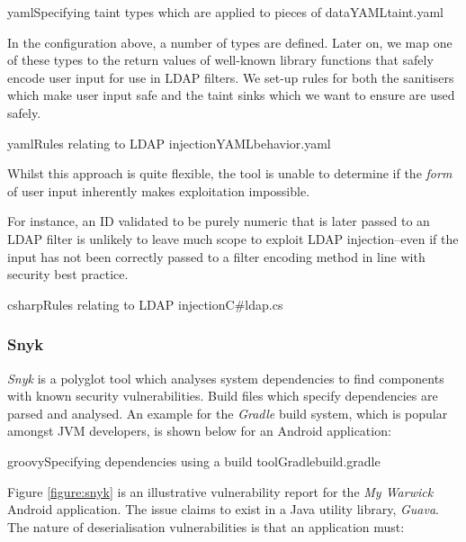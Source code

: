 \documentclass[a4paper,openany,12pt]{book}
\begin{document}
\begin{mycodefile}{yaml}{\label{code:scs:1}Specifying taint types which are applied to pieces of data}{YAML}{taint.yaml}
\end{mycodefile}

In the configuration above, a number of types are defined. Later on, we map one of these types to the return values of
well-known library functions that safely encode user input for use in LDAP filters.
We set-up rules for both the sanitisers which make user input safe and the taint sinks which we want to ensure are used
safely.

\begin{mycodefile}{yaml}{\label{code:scs:2}Rules relating to LDAP injection}{YAML}{behavior.yaml}
\end{mycodefile}

Whilst this approach is quite flexible, the tool is unable to determine if the \textit{form} of user input inherently
makes exploitation impossible.

For instance, an ID validated to be purely numeric that is later passed to an LDAP filter is unlikely to leave much
scope to exploit LDAP injection--even if the input has not been correctly passed to a filter encoding method in
line with security best practice.

\begin{mycodefile}{csharp}{\label{code:scs:3}Rules relating to LDAP injection}{C\#}{ldap.cs}
\end{mycodefile}

\subsubsection{Snyk}

\emph{Snyk} is a polyglot tool which analyses system dependencies to find components with known security vulnerabilities.
Build files which specify dependencies are parsed and analysed.
An example for the \emph{Gradle} build system, which is popular amongst JVM developers, is shown below for an Android
application:

\begin{mycodefile}{groovy}{\label{code:gradle:1}Specifying dependencies using a build tool}{Gradle}{build.gradle}
\end{mycodefile}

Figure \ref{figure:snyk} is an illustrative vulnerability report for the \emph{My Warwick} Android application.
The issue claims to exist in a Java utility library, \emph{Guava}.
The nature of deserialisation vulnerabilities is that an application must:
\end{document}
